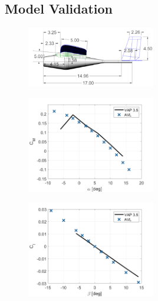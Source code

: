 \subsection{Model Validation}

\begin{figure}[H]
    \centering
    \includegraphics[width=0.5\textwidth]{05_Results/Figs/VAP/genMAV/dimensions.png}
    \label{fig:genMAVDimensions}
\end{figure}

\begin{figure}[H]
         \centering
         \includegraphics[width=0.5\textwidth]{05_Results/Figs/VAP/genMAV/GenMAVModelValidation1.png}
         \label{fig:genMAV_Cm}
         \caption{}
\end{figure}

\begin{figure}[H]
         \centering
         \includegraphics[width=0.5\textwidth]{05_Results/Figs/VAP/genMAV/GenMAVModelValidation2.png}
         \label{fig:genMAV_Cl_roll}
         \caption{}
\end{figure}

